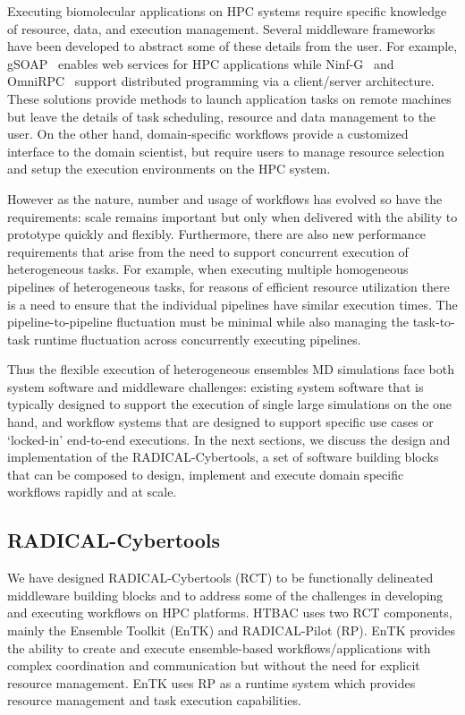 \documentclass{bmcart}
\begin{document}
Executing biomolecular applications on HPC systems require specific knowledge 
of resource, data, and execution management. Several middleware frameworks~\cite{middleware} 
have been developed to abstract some of these details from the user. 
For example, gSOAP~\cite{gsoap} enables web 
services for HPC applications while Ninf-G~\cite{ninf} and OmniRPC~\cite{omnirpc} support distributed 
programming via a client/server architecture. These solutions provide methods
to launch application tasks on remote machines but leave the details of task 
scheduling, resource and data management to the user. On the other hand, 
domain-specific workflows provide a customized interface to the domain 
scientist, but require users to manage resource selection and setup the 
execution environments on the HPC system. 

However as the nature, number and usage of workflows has evolved so have the
requirements: scale remains important but only when delivered with the
ability to prototype quickly and flexibly. Furthermore, there are also new
performance requirements that arise from the need to support concurrent
execution of heterogeneous tasks. For example, when executing multiple
homogeneous pipelines of heterogeneous tasks, for reasons of efficient
resource utilization there is a need to ensure that the individual pipelines
have similar execution times. The pipeline-to-pipeline fluctuation must be
minimal while also managing the task-to-task runtime fluctuation across
concurrently executing pipelines.

Thus the flexible execution of heterogeneous ensembles MD simulations face
both system software and middleware challenges: existing system software that
is typically designed to support the execution of single large simulations on
the one hand, and workflow systems that are designed to support specific use
cases or `locked-in' end-to-end executions. In the next sections, we discuss
the design and implementation of the RADICAL-Cybertools, a set of software
building blocks that can be composed to design, implement and execute
domain specific workflows rapidly and at scale.


\subsection*{RADICAL-Cybertools}\label{ssec:RCT}

We have designed RADICAL-Cybertools (RCT) to be functionally delineated
middleware building blocks and to address some of the challenges in
developing and executing workflows on HPC platforms. HTBAC uses two RCT
components, mainly the Ensemble Toolkit (EnTK) and RADICAL-Pilot (RP).
EnTK provides the ability to create and execute ensemble-based
workflows/applications with complex coordination and communication but
without the need for explicit resource management. EnTK uses RP as a
runtime system which provides resource management and task execution
capabilities.
\end{document}
